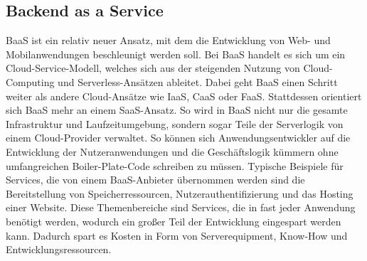 \subsection{Backend as a Service}
\ac{BaaS} ist ein relativ neuer Ansatz, mit dem die Entwicklung von Web- und Mobilanwendungen beschleunigt werden soll.
Bei \ac{BaaS} handelt es sich um ein Cloud-Service-Modell, welches sich aus der steigenden Nutzung von Cloud-Computing und Serverless-Ansätzen ableitet.
Dabei geht \ac{BaaS} einen Schritt weiter als andere Cloud-Ansätze wie \ac{IaaS}, \ac{CaaS} oder \ac{FaaS}.
Stattdessen orientiert sich \ac{BaaS} mehr an einem \ac{SaaS}-Ansatz. %
So wird in \ac{BaaS} nicht nur die gesamte Infrastruktur und Laufzeitumgebung, sondern sogar Teile der Serverlogik von einem Cloud-Provider verwaltet.\autocite[Vgl.][]{cloudflareBaaS}
So können sich Anwendungsentwickler auf die Entwicklung der Nutzeranwendungen und die Geschäftslogik kümmern ohne umfangreichen Boiler-Plate-Code schreiben zu müssen.
Typische Beispiele für Services, die von einem \ac{BaaS}-Anbieter übernommen werden sind die Bereitstellung von Speicherressourcen, Nutzerauthentifizierung und das Hosting einer Website.
Diese Themenbereiche sind Services, die in fast jeder Anwendung benötigt werden, wodurch ein großer Teil der Entwicklung eingespart werden kann.
Dadurch spart es Kosten in Form von Serverequipment, Know-How und Entwicklungsressourcen.


